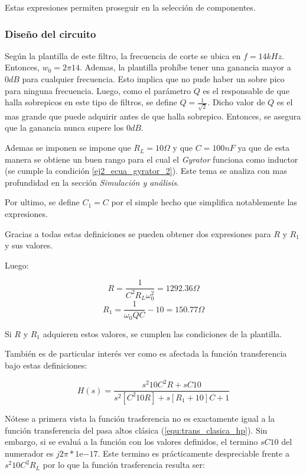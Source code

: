 Estas expresiones permiten proseguir en la selección de componentes. 


\subsubsection{Diseño del circuito}

Según la plantilla de este filtro, la frecuencia de corte se ubica en $f = 14kHz$. Entonces, $w_0 = 2\pi 14$. Ademas, la plantilla prohíbe tener una ganancia mayor a $0 dB$ para cualquier frecuencia. Esto implica que no pude haber un sobre pico para ninguna frecuencia. Luego, como el parámetro $Q$ es el responsable de que halla sobrepicos en este tipo de filtros, se define  $Q=\frac{1}{\sqrt{2}}$. Dicho valor de $Q$ es el mas grande que puede adquirir antes de que halla sobrepico. Entonces, se asegura que la ganancia nunca supere los $0dB$.  


Ademas se imponen se impone que $R_L = 10 \Omega$ y que $ C = 100nF$ ya que de esta manera se obtiene un buen rango para el cual el \textit{Gyrator} funciona como inductor (se cumple la condición \ref{ej2_ecua_gyrator_2}). Este tema se analiza con mas profundidad en la sección \textit{Simulación y análisis}.

Por ultimo, se define $C_1 = C$ por el simple hecho que simplifica notablemente las expresiones. 

Gracias a todas estas definiciones se pueden obtener dos expresiones para $R$ y $R_1$ y sus valores.  

Luego:

\begin{displaymath} R = \frac{1}{C^2 R_L \omega_0^2} = 1292.36 \Omega \end{displaymath}  
\begin{displaymath} R_1 = \frac{1}{\omega_0 Q C} - 10 = 150.77 \Omega \end{displaymath}  

Si $R$ y $R_1$ adquieren estos valores, se cumplen las condiciones de la plantilla. 

También es de particular interés ver como es afectada la función transferencia bajo estas definiciones:

\begin{displaymath} H(s)= \frac{s^2 10 C ^2 R + sC10}{s^2[C^2 10 R] + s[R_1 + 10]C + 1} \end{displaymath}

Nótese a primera vista la función trasferencia no es exactamente igual a la función transferencia del pasa altos clásica (\ref{equ:trans_clasica_hp}). Sin embargo, si se evaluá a la función con los valores definidos, el termino $sC10$ del numerador es $j2\pi * 1\mathrm{e}{-17}$. Este termino es prácticamente despreciable frente a $s^2 10 C^2 R_L$  por lo que la función trasferencia resulta ser:


